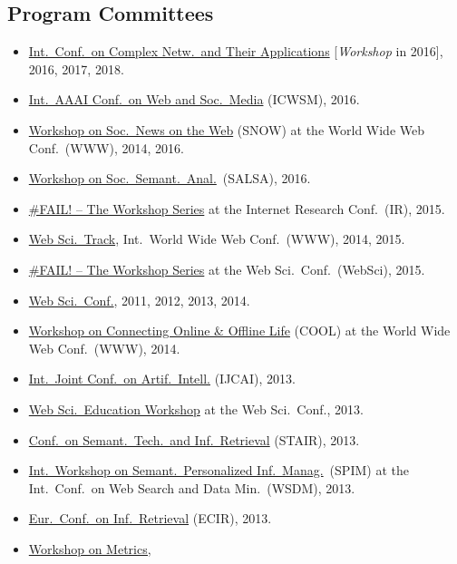 \documentclass[line,mm]{res}
\newcounter{x}
\newcounter{y}
\newcounter{z}
\begin{document}
\begin{resume}
\section{Program Committees}
\begin{itemize}
\item \href{http://www.complexnetworks.org/}{Int.\ Conf.\ on Complex
  Netw.\ and Their Applications} [\emph{Workshop} in 2016], 2016, 2017, 2018.   
\item \href{http://www.icwsm.org/2016/index.php}{Int.\ AAAI Conf.\ on
  Web and Soc.\ Media} (ICWSM), 2016.
\item \href{http://www.snow-workshop.org/}{Workshop on Soc.\ News on
  the Web} (SNOW) at the World Wide Web Conf.\ (WWW), 2014, 2016. 
\item \href{http://events.kmi.open.ac.uk/salsa2016/}{Workshop on Soc.\ Semant.\ Anal.}\ (SALSA), 2016.
\item \href{https://failworkshops.wordpress.com/fail-at-ir16/}{\#FAIL!
  -- The Workshop Series} at the Internet Research Conf.\ (IR), 2015.
\item \href{http://www.www2015.it/call-for-web-science-track/}{Web
  Sci.\ Track}, Int.\ World Wide Web Conf.\ (WWW), 2014, 2015.
\item \href{https://failworkshops.wordpress.com/fail-workshop-at-websci15/}{\#FAIL! -- The Workshop Series} at the Web Sci.\ Conf.\ (WebSci), 2015.
\item \href{http://www.websci14.org/}{Web Sci.\ Conf.},
  2011, 2012, 2013, 2014. 
\item \href{http://www.cool2014.com/}{Workshop on Connecting Online \&
  Offline Life} (COOL) at the World Wide Web Conf.\ (WWW), 2014. 
\item \href{http://ijcai13.org/}{Int.\ Joint Conf.\ on Artif.\ Intell.} (IJCAI), 2013.  
\item \href{http://webscience-education-workshop.blogs.usj.edu.lb/}{Web
  Sci.\ Education Workshop} at the Web Sci.\ Conf., 2013. 
\item \href{http://www.ftsm.ukm.my/stair13/}{Conf.\ on Semant.\ Tech.\ and Inf.\ Retrieval} (STAIR), 2013. 
\item \href{http://spim-workshop.org/}{Int.\ Workshop on Semant.\ Personalized Inf.\ Manag.}\ (SPIM) at the Int.\ Conf.\ on Web
  Search and Data Min.\ (WSDM), 2013.  
\item \href{http://ecir2013.org/}{Eur.\ Conf.\ on Inf.\ Retrieval} (ECIR), 2013.  
\item \href{http://mama.west.uni-koblenz.de/}{Workshop on Metrics,
}
\end{itemize}
\end{resume}
\end{document}
